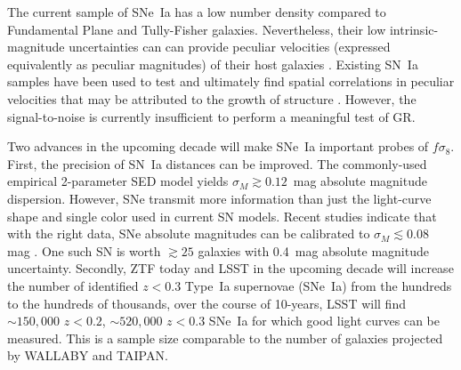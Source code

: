 \documentclass{aastex62}   	%
\begin{document}
The current sample of SNe~Ia has a low number density compared to Fundamental Plane and Tully-Fisher galaxies.
Nevertheless, their low intrinsic-magnitude uncertainties can 
can provide peculiar velocities (expressed equivalently as peculiar magnitudes)
of their host galaxies \citep{2006PhRvD..73l3526H,2011ApJ...741...67D}.  Existing SN~Ia samples
have been used to test and ultimately find spatial correlations in peculiar velocities that may be attributed to the growth of structure
\citep{2008MNRAS.389L..47A,2015JCAP...12..033H, 2017JCAP...05..015H}.
However, the signal-to-noise is currently insufficient to perform a meaningful test of GR.

Two advances in the upcoming decade will make SNe~Ia  important probes of $f\sigma_8$.
First, the precision of SN~Ia distances can be improved.  The commonly-used empirical 2-parameter SED model yields $\sigma_M \gtrsim 0.12$~mag absolute magnitude
dispersion.  However, SNe transmit more information than just the light-curve shape and single color used in current SN models.
Recent studies indicate that with the right data, SNe absolute
magnitudes can be calibrated to $\sigma_M \lesssim 0.08$ mag \citep[see e.g.][]{2012MNRAS.425.1007B, 2015ApJ...815...58F}.
One such SN is worth $\gtrsim 25$ galaxies with 0.4~mag absolute magnitude uncertainty.
Secondly,  ZTF today and LSST in the upcoming decade will increase the number of identified  $z<0.3$ Type~Ia supernovae (SNe~Ia)  from the hundreds to the
hundreds of thousands, over the course of 10-years, LSST will find $\sim150,000$ $z<0.2$,  $\sim520,000$ $z<0.3$ SNe~Ia for which good light curves can be measured. This is a sample size comparable to the number of galaxies projected by WALLABY and TAIPAN.
\end{document}
